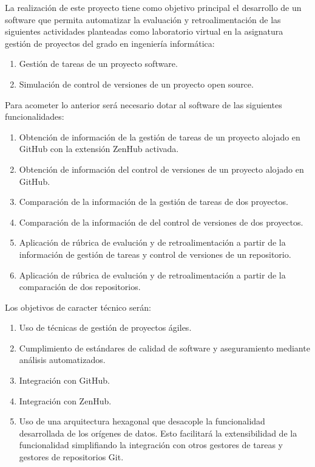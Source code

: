 
La realización de este proyecto tiene como objetivo principal el desarrollo de un software que permita automatizar la evaluación y retroalimentación de las siguientes actividades planteadas como laboratorio virtual en la asignatura gestión de proyectos del grado en ingeniería informática:

\begin{enumerate}
	\item Gestión de tareas de un proyecto software. 
	\item Simulación de control de versiones de un proyecto open source.
\end{enumerate}

Para acometer lo anterior será necesario dotar al software de las siguientes funcionalidades:

\begin{enumerate}
	\item Obtención de información de la gestión de tareas de un proyecto alojado en GitHub con la extensión ZenHub activada.	
	\item Obtención de información del control de versiones de un proyecto alojado en GitHub.
	\item Comparación de la información de la gestión de tareas de dos proyectos.
	\item Comparación de la información de del control de versiones de dos proyectos.			
	\item Aplicación de rúbrica de evalución y de retroalimentación a partir de la información de gestión de tareas y control de versiones de un repositorio.
	\item Aplicación de rúbrica de evalución y de retroalimentación a partir de la comparación de dos repositorios.	 		  
\end{enumerate}

Los objetivos de caracter técnico serán:

\begin{enumerate}
	\item Uso de técnicas de gestión de proyectos ágiles.
	\item Cumplimiento de estándares de calidad de software y aseguramiento mediante análisis automatizados.
	\item Integración con GitHub. 
	\item Integración con ZenHub.
	\item Uso de una arquitectura hexagonal que desacople la funcionalidad desarrollada de los orígenes de datos. Esto facilitará la extensibilidad de la funcionalidad simplifiando la  integración con otros gestores de tareas y gestores de repositorios Git.
\end{enumerate}

